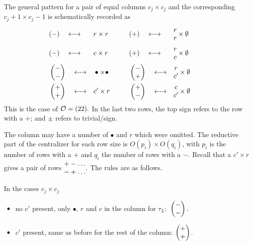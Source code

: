 \documentclass[11pt ,reqno]{amsart}
\begin{document}
The general pattern for a  pair of equal columns $c_j\times c_{j}$ and
the corresponding
$c_{j}+1\times c_{j}-1$ is schematically recorded as
$$
\begin{aligned}
&(-)\quad\longleftrightarrow &&r\times r \qquad &&
(+)\quad\longleftrightarrow&&\begin{matrix}
 r\\r
\end{matrix}\times\emptyset\\ 
&(-)\quad\longleftrightarrow &&c\times r\qquad &&(+)\quad\longleftrightarrow&&\begin{matrix}
r\\c
\end{matrix}\times\emptyset  && \\
&\left(\begin{matrix} -\\ -\end{matrix}\right)\quad \longleftrightarrow&&\bullet\times\bullet\qquad &&
\left(\begin{matrix} -\\ +\end{matrix}\right)\quad\longleftrightarrow&&\begin{matrix}
r\\c'
\end{matrix}\times\emptyset\\
&\left(\begin{matrix} +\\ +\end{matrix}\right)\quad\longleftrightarrow &&c'\times r&&
\left(\begin{matrix} +\\ -\end{matrix}\right)\quad\longleftrightarrow &&\begin{matrix}
c\\c'
\end{matrix}\times\emptyset
\end{aligned}
$$
This is the case of $\mathcal O=(22).$ 
In the last two rows, the top sign refers to the row with a $+$; and
$\pm$ refers to trivial/sign.


The column may have a number of $\bullet$ and $r$ which were
omitted. The reductive part of the centralizer for each row size is $O(p_i)\times
O(q_i)$, with $p_i$ is the number of rows with a $+$ and $q_i$ the
number of rows with a $-.$ Recall that a $c'\times r$ gives a pair of
rows $\begin{matrix} +-\dots\\-+\dots\end{matrix}.$ The rules are as follows.

In the cases $c_{j}\times c_{j}$
\begin{itemize}
\item no $c'$ present, only $\bullet$, $r$ and $c$ in the column for
  $\tau_L:$ $\left(\begin{matrix}-\\-\end{matrix}\right).$ 
\item $c'$ present, same as before for the rest of the column:
  $\left(\begin{matrix} +\\+\end{matrix}\right)$.
\end{itemize}
\end{document}
